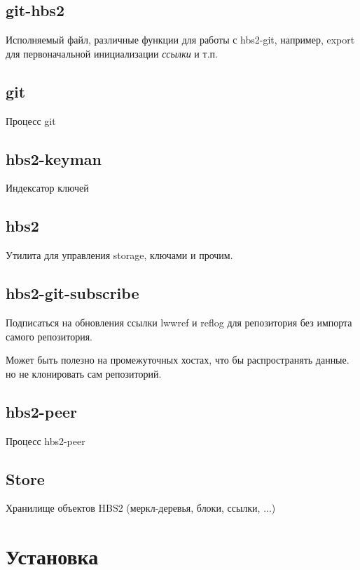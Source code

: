 \documentclass[11pt,a4paper]{article}
\begin{document}
\subsection*{git-hbs2}

Исполняемый файл, различные функции для работы с hbs2-git, например,
export для первоначальной  инициализации \textit{ссылки} и т.п.

\subsection*{git}

Процесс git

\subsection*{hbs2-keyman}

Индексатор ключей

\subsection*{hbs2}

Утилита для управления storage, ключами и прочим.

\subsection*{hbs2-git-subscribe}

Подписаться на обновления ссылки lwwref и reflog для репозитория
без импорта самого репозитория.

Может быть полезно на промежуточных хостах, что бы распространять
данные. но не клонировать сам репозиторий.

\subsection*{hbs2-peer}

Процесс hbs2-peer

\subsection*{Store}

Хранилище объектов HBS2 (меркл-деревья, блоки, ссылки, ...)



\section{Установка}
\end{document}
